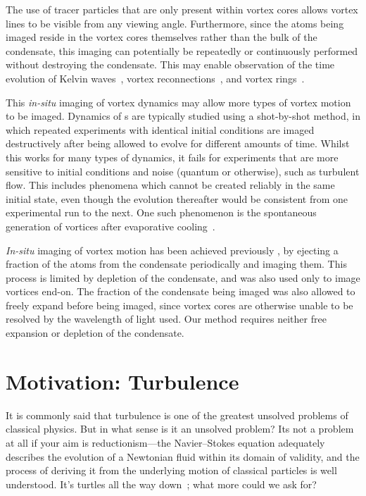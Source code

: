 The use of tracer particles that are only present within vortex cores allows vortex lines to be visible from any viewing angle.  Furthermore, since the atoms being imaged reside in the vortex cores themselves rather than the bulk of the condensate, this imaging can potentially be repeatedly or continuously performed without destroying the condensate. This may enable observation of the time evolution of Kelvin waves~\cite{bretin_quadrupole_2003}, vortex reconnections~\cite{leadbeater_sound_2001}, and vortex rings~\cite{anderson_watching_2001}.

This \emph{in-situ} imaging of vortex dynamics may allow more types of vortex motion to be imaged. Dynamics of \bec s are typically studied using a shot-by-shot method, in which repeated experiments with identical initial conditions are imaged destructively after being allowed to evolve for different amounts of time. Whilst this works for many types of dynamics, it fails for experiments that are more sensitive to initial conditions and noise (quantum or otherwise), such as turbulent flow. This includes phenomena which cannot be created reliably in the same initial state, even though the evolution thereafter would be consistent from one experimental run to the next. One such phenomenon is the spontaneous generation of vortices after evaporative cooling~\cite{weiler_spontaneous_2008}.

\emph{In-situ} imaging of vortex motion has been achieved previously \cite{freilich_real-time_2010}, by ejecting a fraction of the atoms from the condensate periodically and imaging them. This process is limited by depletion of the condensate, and was also used only to image vortices end-on. The fraction of the condensate being imaged was also allowed to freely expand before being imaged, since vortex cores are otherwise unable to be resolved by the wavelength of light used. Our method requires neither free expansion or depletion of the condensate.

\section{Motivation: Turbulence}

It is commonly said that turbulence is one of the greatest unsolved problems of classical physics. But in what sense is it an unsolved problem? Its not a problem at all if your aim is reductionism---the Navier--Stokes equation adequately describes the evolution of a Newtonian fluid within its domain of validity, and the process of deriving it from the underlying motion of classical particles is well understood. It's turtles all the way down~\cite[p 1]{hawking_brief_1988}; what more could we ask for?

